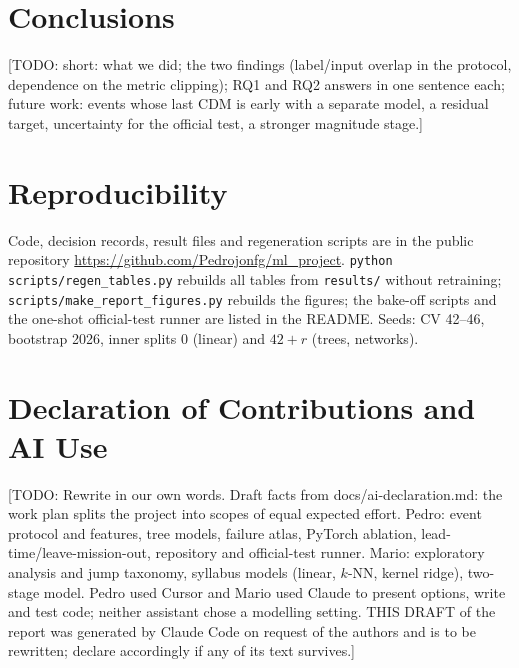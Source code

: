 \documentclass[clean,twocolumn]{bam-proposal}
\newcommand{\todo}[1]{{\color{red}[TODO: #1]}}
\begin{document}
\section{Conclusions}
\todo{short: what we did; the two findings (label/input overlap in the protocol, dependence on the metric clipping); RQ1 and RQ2 answers in one sentence each; future work: events whose last CDM is early with a separate model, a residual target, uncertainty for the official test, a stronger magnitude stage.}

\section*{Reproducibility}
Code, decision records, result files and regeneration scripts are in the public repository \url{https://github.com/Pedrojonfg/ml_project}. \texttt{python scripts/regen\_tables.py} rebuilds all tables from \texttt{results/} without retraining; \texttt{scripts/make\_report\_figures.py} rebuilds the figures; the bake-off scripts and the one-shot official-test runner are listed in the README. Seeds: CV 42--46, bootstrap 2026, inner splits 0 (linear) and $42+r$ (trees, networks).

\section*{Declaration of Contributions and AI Use}
\todo{Rewrite in our own words. Draft facts from docs/ai-declaration.md: the work plan splits the project into scopes of equal expected effort. Pedro: event protocol and features, tree models, failure atlas, PyTorch ablation, lead-time/leave-mission-out, repository and official-test runner. Mario: exploratory analysis and jump taxonomy, syllabus models (linear, $k$-NN, kernel ridge), two-stage model. Pedro used Cursor and Mario used Claude to present options, write and test code; neither assistant chose a modelling setting. THIS DRAFT of the report was generated by Claude Code on request of the authors and is to be rewritten; declare accordingly if any of its text survives.}

\BAMprintbibliography
\end{document}
